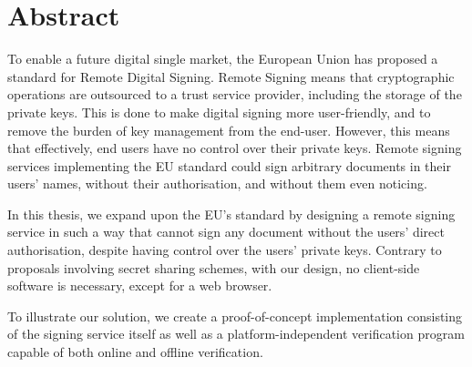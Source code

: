 \chapter*{Abstract}\label{ch:abstract}
To enable a future digital single market,
the European Union has proposed a standard for Remote Digital Signing.
Remote Signing means that cryptographic operations are outsourced to a trust service provider,
including the storage of the private keys.
This is done to make digital signing more user-friendly,
and to remove the burden of key management from the end-user.
However, this means that effectively, end users have no control over their private keys.
Remote signing services implementing the EU standard could sign arbitrary documents in their users' names,
without their authorisation, and without them even noticing.

In this thesis,
we expand upon the EU's standard by designing a remote signing service in such a way that cannot sign any document without the users' direct authorisation,
despite having control over the users' private keys.
Contrary to proposals involving secret sharing schemes,
with our design, no client-side software is necessary, except for a web browser.

To illustrate our solution,
we create a proof-of-concept implementation consisting of the signing service itself as well as a
 platform-independent verification program capable of both online and offline verification.




